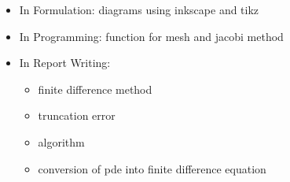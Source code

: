 	\begin{itemize}
		\item In Formulation: diagrams using inkscape and tikz
		\item  In Programming: function for mesh and jacobi method
		
		\item  In Report Writing: 
			\begin{itemize}
				\item  finite difference method
				\item  truncation error
				\item  algorithm 
				\item conversion of pde into finite difference equation
			\end{itemize}
	\end{itemize}


	